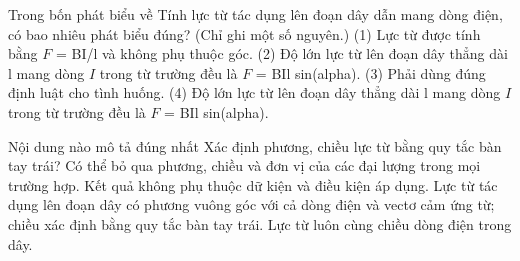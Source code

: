 \begin{ex}
Trong bốn phát biểu về Tính lực từ tác dụng lên đoạn dây dẫn mang dòng điện, có bao nhiêu phát biểu đúng? (Chỉ ghi một số nguyên.) (1) Lực từ được tính bằng $F$ = BI/l và không phụ thuộc góc. (2) Độ lớn lực từ lên đoạn dây thẳng dài l mang dòng $I$ trong từ trường đều là $F$ = BIl sin(alpha). (3) Phải dùng đúng định luật cho tình huống. (4) Độ lớn lực từ lên đoạn dây thẳng dài l mang dòng $I$ trong từ trường đều là $F$ = BIl sin(alpha).
\end{ex}

\begin{ex}
Nội dung nào mô tả đúng nhất Xác định phương, chiều lực từ bằng quy tắc bàn tay trái?
\choice
{Có thể bỏ qua phương, chiều và đơn vị của các đại lượng trong mọi trường hợp.}
{Kết quả không phụ thuộc dữ kiện và điều kiện áp dụng.}
{\True Lực từ tác dụng lên đoạn dây có phương vuông góc với cả dòng điện và vectơ cảm ứng từ; chiều xác định bằng quy tắc bàn tay trái.}
{Lực từ luôn cùng chiều dòng điện trong dây.}
\end{ex}

